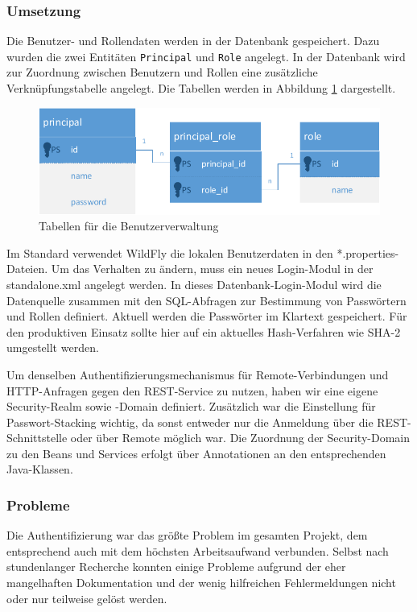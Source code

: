 \subsubsection{Umsetzung}
Die Benutzer- und Rollendaten werden in der Datenbank gespeichert. Dazu wurden die zwei Entitäten \texttt{Principal} und \texttt{Role} angelegt. In der Datenbank wird zur Zuordnung zwischen Benutzern und Rollen eine zusätzliche Verknüpfungstabelle angelegt. Die Tabellen werden in Abbildung \ref{fig:BenutzerRollen} dargestellt.

\begin{figure}[tbh]
\centering
\includegraphics[width=0.8\linewidth]{Bilder/BenutzerRollen}
\caption{Tabellen für die Benutzerverwaltung}
\label{fig:BenutzerRollen}
\end{figure}

Im Standard verwendet WildFly die lokalen Benutzerdaten in den *.properties-Dateien. Um das Verhalten zu ändern, muss ein neues Login-Modul in der standalone.xml angelegt werden. In dieses Datenbank-Login-Modul wird die Datenquelle zusammen mit den SQL-Abfragen zur Bestimmung von Passwörtern und Rollen definiert. Aktuell werden die Passwörter im Klartext gespeichert. Für den produktiven Einsatz sollte hier auf ein aktuelles Hash-Verfahren wie SHA-2 umgestellt werden.

Um denselben Authentifizierungsmechanismus für Remote-Verbindungen und HTTP-Anfragen gegen den REST-Service zu nutzen, haben wir eine eigene Security-Realm sowie -Domain definiert. Zusätzlich war die Einstellung für Passwort-Stacking wichtig, da sonst entweder nur die Anmeldung über die REST-Schnittstelle oder über Remote möglich war. Die Zuordnung der Security-Domain zu den Beans und Services erfolgt über Annotationen an den entsprechenden Java-Klassen. 

\subsubsection{Probleme}
Die Authentifizierung war das größte Problem im gesamten Projekt, dem entsprechend auch mit dem höchsten Arbeitsaufwand verbunden. Selbst nach stundenlanger Recherche konnten einige Probleme aufgrund der eher mangelhaften Dokumentation und der wenig hilfreichen Fehlermeldungen nicht oder nur teilweise gelöst werden.

